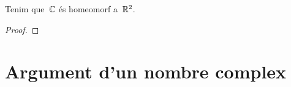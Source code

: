 \documentclass[../Apunts.tex]{subfiles}
\begin{document}
	\begin{proposition}
		\label{prop:el pla complex és homeomorf al pla real}
		Tenim que~\(\mathbb{C}\) és homeomorf a~\(\mathbb{R}^{2}\).
		\begin{proof}
		\end{proof}
	\end{proposition}
	\section{Argument d'un nombre complex}
\end{document}
